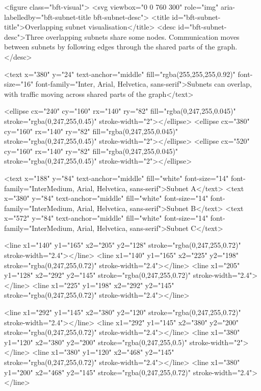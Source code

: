 \begin{rawhtml}
<figure class="bft-visual">
            <svg viewbox="0 0 760 300" role="img" aria-labelledby="bft-subnet-title bft-subnet-desc">
                <title id="bft-subnet-title">Overlapping subnet visualisation</title>
                <desc id="bft-subnet-desc">Three overlapping subnets share some nodes. Communication moves between subnets by following edges through the shared parts of the graph.</desc>

                <text x="380" y="24" text-anchor="middle" fill="rgba(255,255,255,0.92)" font-size="16" font-family="Inter, Arial, Helvetica, sans-serif">Subnets can overlap, with traffic moving across shared parts of the graph</text>

                <ellipse cx="240" cy="160" rx="140" ry="82" fill="rgba(0,247,255,0.045)" stroke="rgba(0,247,255,0.45)" stroke-width="2"></ellipse>
                <ellipse cx="380" cy="160" rx="140" ry="82" fill="rgba(0,247,255,0.045)" stroke="rgba(0,247,255,0.45)" stroke-width="2"></ellipse>
                <ellipse cx="520" cy="160" rx="140" ry="82" fill="rgba(0,247,255,0.045)" stroke="rgba(0,247,255,0.45)" stroke-width="2"></ellipse>

                <text x="188" y="84" text-anchor="middle" fill="white" font-size="14" font-family="InterMedium, Arial, Helvetica, sans-serif">Subnet A</text>
                <text x="380" y="84" text-anchor="middle" fill="white" font-size="14" font-family="InterMedium, Arial, Helvetica, sans-serif">Subnet B</text>
                <text x="572" y="84" text-anchor="middle" fill="white" font-size="14" font-family="InterMedium, Arial, Helvetica, sans-serif">Subnet C</text>

                <line x1="140" y1="165" x2="205" y2="128" stroke="rgba(0,247,255,0.72)" stroke-width="2.4"></line>
                <line x1="140" y1="165" x2="225" y2="198" stroke="rgba(0,247,255,0.72)" stroke-width="2.4"></line>
                <line x1="205" y1="128" x2="292" y2="145" stroke="rgba(0,247,255,0.72)" stroke-width="2.4"></line>
                <line x1="225" y1="198" x2="292" y2="145" stroke="rgba(0,247,255,0.72)" stroke-width="2.4"></line>

                <line x1="292" y1="145" x2="380" y2="120" stroke="rgba(0,247,255,0.72)" stroke-width="2.4"></line>
                <line x1="292" y1="145" x2="380" y2="200" stroke="rgba(0,247,255,0.72)" stroke-width="2.4"></line>
                <line x1="380" y1="120" x2="380" y2="200" stroke="rgba(0,247,255,0.5)" stroke-width="2"></line>
                <line x1="380" y1="120" x2="468" y2="145" stroke="rgba(0,247,255,0.72)" stroke-width="2.4"></line>
                <line x1="380" y1="200" x2="468" y2="145" stroke="rgba(0,247,255,0.72)" stroke-width="2.4"></line>


\end{rawhtml}
